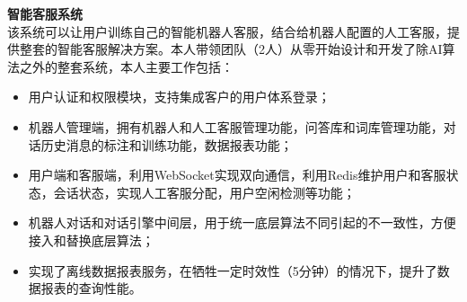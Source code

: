 \documentclass[a4paper]{article}
\newenvironment{changemargin}[2]{%
  \begin{list}{}{%
    \setlength{\topsep}{0pt}%
    \setlength{\leftmargin}{#1}%
    \setlength{\rightmargin}{#2}%
    \setlength{\listparindent}{\parindent}%
    \setlength{\itemindent}{\parindent}%
    \setlength{\parsep}{\parskip}%
  }%
  \item[]}{\end{list}
}
\newenvironment{body} {
	\vspace*{-16pt}
	\begin{changemargin}{-0.5in}{-0.5in}
  }	
	{\end{changemargin}
}
\begin{document}
\begin{body}
 	\vspace{14pt}
  	\textbf{智能客服系统} \\
  	\smallskip
	该系统可以让用户训练自己的智能机器人客服，结合给机器人配置的人工客服，提供整套的智能客服解决方案。本人带领团队（2人）从零开始设计和开发了除AI算法之外的整套系统，本人主要工作包括：
	\vspace*{-2pt}
	\begin{itemize} \itemsep -0pt  %
		\item 用户认证和权限模块，支持集成客户的用户体系登录；\\
	\end{itemize}
	\vspace*{-10pt}
	\begin{itemize} \itemsep -0pt  %
		\item 机器人管理端，拥有机器人和人工客服管理功能，问答库和词库管理功能，对话历史消息的标注和训练功能，数据报表功能；\\
	\end{itemize}
	\vspace*{-10pt}
	\begin{itemize} \itemsep -0pt  %
		\item 用户端和客服端，利用WebSocket实现双向通信，利用Redis维护用户和客服状态，会话状态，实现人工客服分配，用户空闲检测等功能；\\
	\end{itemize}
	\vspace*{-10pt}
	\begin{itemize} \itemsep -0pt  %
		\item 机器人对话和对话引擎中间层，用于统一底层算法不同引起的不一致性，方便接入和替换底层算法；\\
	\end{itemize}
	\vspace*{-10pt}
	\begin{itemize} \itemsep -0pt  %
		\item 实现了离线数据报表服务，在牺牲一定时效性（5分钟）的情况下，提升了数据报表的查询性能。\\
	\end{itemize}


\end{body}
\end{document}
